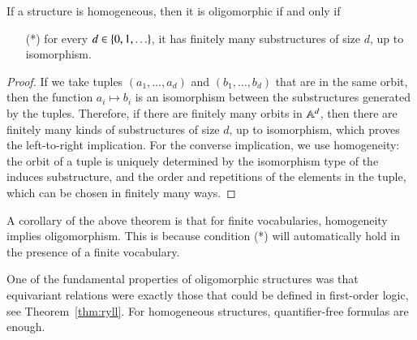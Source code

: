 \begin{theorem}\label{thm:hom-oligo}
If a structure is homogeneous,  then it is oligomorphic if and only if 
\begin{itemize}
	\item[(*)]for every $d \in \{0,1,\ldots\}$, it has finitely many substructures of size $d$, up to isomorphism.
\end{itemize}
\end{theorem}
\begin{proof}
	If we take  tuples $
	(a_1,\ldots,a_d)$ and $(b_1,\ldots,b_d)$  
	that are in the same orbit, then the function $a_i \mapsto b_i$ is an isomorphism between the substructures generated by the tuples. Therefore, if there are finitely many orbits in $\mathbb A^d$, then there are finitely many kinds of substructures of size $d$, up to isomorphism, which proves the left-to-right implication. For the converse implication, we use homogeneity: the orbit of a tuple is uniquely determined by the isomorphism type of the induces substructure, and the order and repetitions of the elements in the tuple, which can be chosen in finitely many ways. 
\end{proof}

A corollary of the above theorem is that for finite vocabularies, homogeneity implies oligomorphism. This is because condition (*) will automatically hold in the presence of a finite vocabulary. 
	
	





 One of the fundamental properties of  oligomorphic structures was that equivariant relations were exactly those that could be defined in first-order logic, see Theorem~\ref{thm:ryll}. For homogeneous structures, quantifier-free formulas are enough. 

